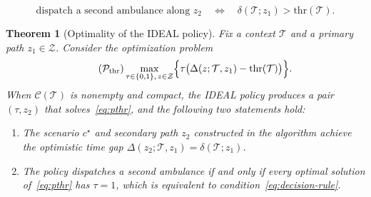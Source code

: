 \documentclass[10pt,a4paper]{amsart}
\newtheorem{theorem}{Theorem}
\newcommand{\opt}{^\star}
\begin{document}
\begin{equation}
\label{eq:decision-rule}
\text{dispatch a second ambulance along } z_2
\quad\Longleftrightarrow\quad
\delta(\mathcal T; z_1) > \mathrm{thr}(\mathcal T).
\end{equation} 

\begin{theorem}[Optimality of the IDEAL policy]
\label{thm:ideal_optimality}
Fix a context $\mathcal T$ and a primary path $z_1 \in \mathcal Z$. Consider the optimization problem
\begin{equation}
\label{eq:pthr}
\tag{$\mathcal P_{\text{thr}}$}
\max_{\tau\in\{0,1\},\,z\in\mathcal Z} \Bigl\{ \tau\bigl( \Delta(z;\mathcal T,z_1) - \mathrm{thr}(\mathcal T) \bigr) \Bigr\}.
\end{equation}
When $\mathcal C(\mathcal T)$ is nonempty and compact, the IDEAL policy produces a pair $(\tau,z_2)$ that solves~\eqref{eq:pthr}, and the following two statements hold:
\begin{enumerate}[leftmargin=7mm]
\item The scenario $c\opt$ and secondary path $z_2$ constructed in the algorithm achieve the optimistic time gap $\Delta(z_2;\mathcal T,z_1) = \delta(\mathcal T; z_1)$.
\item The policy dispatches a second ambulance if and only if every optimal solution of~\eqref{eq:pthr} has $\tau=1$, which is equivalent to condition~\eqref{eq:decision-rule}.
\end{enumerate}
\end{theorem}
\end{document}
